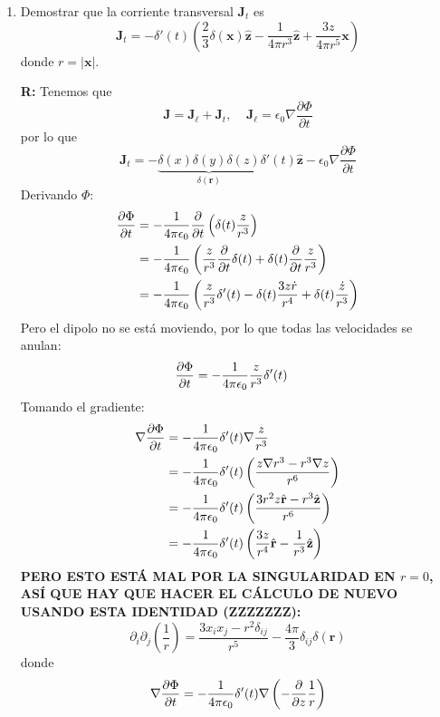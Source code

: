 \documentclass[]{article}
\numberwithin{equation}{section}
\newcommand{\0}{\textcolor{gray}{0}}
\newcommand{\gr}{\nabla}
\newcommand{\rv}{\mathbf{r}}
\newcommand{\xv}{\mathbf{x}}
\newcommand{\zv}{\mathbf{z}}
\newcommand{\zhat}{\hat{\zv}}
\newcommand{\rhat}{\hat{\rv}}
\newcommand{\eo}{\epsilon_{0}}
\newcommand{\pd}[2]{\dfrac{\partial #1}{\partial #2}}
\newcommand{\n}[1]{\mathbf{#1}}
\begin{document}
\begin{enumerate}
\begin{enumerate}
		\item Demostrar que la corriente transversal \(\n{J}_t\) es
		\begin{equation*}
			\n{J}_t = -\delta'(t)\left(\frac{2}{3} \delta(\xv)\zhat - \frac{1}{4\pi r^3}\zhat + \frac{3 z}{4 \pi r^5}\xv \right)
		\end{equation*}
		donde \(r = |\xv|\).
		
		\textbf{R:} Tenemos que
		\begin{equation*}
			\n{J} = \n{J}_{\ell} + \n{J}_{t}, ~~~~~ \n{J}_{\ell} = \eo\gr\pd{\Phi}{t}
		\end{equation*}
		por lo que
		\begin{equation*}
			\n{J}_{t} = -\underbrace{\delta(x)\delta(y)\delta(z)}_{\delta(\rv)} \delta'(t)\zhat - \eo\gr\pd{\Phi}{t}
		\end{equation*}
		Derivando \(\Phi\):
		\begin{align*}
			\pd{\Phi}{t} &= -\ke \pd{}{t}\left(\delta(t)\frac{z}{r^3}\right)\\
			&= -\ke \left(\frac{z}{r^3}\pd{}{t}\delta(t) + \delta(t)\pd{}{t}\frac{z}{r^3}\right)\\
			&= -\ke \left(\frac{z}{r^3}\delta'(t) - \delta(t)\frac{3 z \dot{r}}{r^4} + \delta(t)\frac{\dot{z}}{r^3}\right)
		\end{align*}
		Pero el dipolo no se está moviendo, por lo que todas las velocidades se anulan:
		\begin{align*}
			\pd{\Phi}{t} &= -\ke \frac{z}{r^3}\delta'(t)
		\end{align*}
		Tomando el gradiente:
		\begin{align*}
			\gr\pd{\Phi}{t} &= -\ke \delta'(t) \gr\frac{z}{r^3}\\
			&= -\ke \delta'(t) \left(\frac{z\gr r^3 - r^3 \gr z}{r^6}\right)\\
			&= -\ke \delta'(t) \left(\frac{3r^2 z \rhat - r^3 \zhat}{r^6}\right)\\
			&= -\ke \delta'(t) \left(\frac{3 z}{r^4}\rhat - \frac{1}{r^3}\zhat\right)
		\end{align*}
		\textbf{PERO ESTO ESTÁ MAL POR LA SINGULARIDAD EN \(r=0\), ASÍ QUE HAY QUE HACER EL CÁLCULO DE NUEVO USANDO ESTA IDENTIDAD (ZZZZZZZ):}
		\begin{equation*}
			\partial_{i}\partial_{j}\left(\frac{1}{r}\right) = \frac{3 x_{i} x_{j} - r^2 \delta_{ij}}{r^5} - \frac{4\pi}{3} \delta_{ij} \delta(\rv)
		\end{equation*}
		donde
		\begin{align*}
			\gr\pd{\Phi}{t} &= -\ke \delta'(t) \gr\left(-\pd{}{z}\frac{1}{r}\right)\\

\end{align*}
\end{enumerate}
\end{enumerate}
\end{document}
